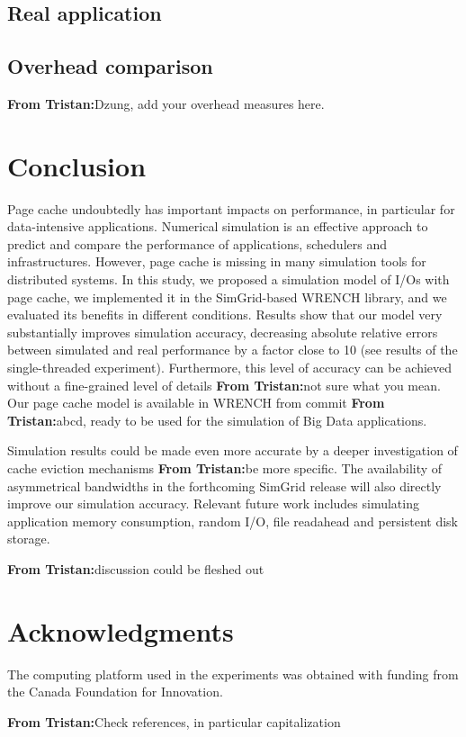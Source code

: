 \documentclass[conference]{IEEEtran}
\newcommand{\tristan}[1]{\color{orange}\textbf{From Tristan:}#1\color{black}}
\begin{document}
        \subsection{Real application}
        \subsection{Overhead comparison}
        \tristan{Dzung, add your overhead measures here.}

    \section{Conclusion}
    \label{discussion}
        Page cache undoubtedly has important impacts on performance, in
        particular for data-intensive applications. Numerical simulation is
        an effective approach to predict and compare the performance of
        applications, schedulers and infrastructures. However, page cache
        is missing in many simulation tools for distributed systems. In
        this study, we proposed a simulation model of I/Os with page cache,
        we implemented it in the SimGrid-based WRENCH library, and we
        evaluated its benefits in different conditions. Results show that
        our model very substantially improves simulation accuracy,
        decreasing absolute relative errors between simulated and real
        performance by a factor close to 10 (see results of the
        single-threaded experiment). Furthermore, this level of accuracy
        can be achieved without a fine-grained level of details
        \tristan{not sure what you mean}. Our page cache model is available
        in WRENCH from commit \tristan{abcd}, ready to be used for the
        simulation of Big Data applications.

        Simulation results could be made even more accurate by a deeper
        investigation of cache eviction mechanisms \tristan{be more
        specific}. The availability of asymmetrical bandwidths in the
        forthcoming SimGrid release will also directly improve our
        simulation accuracy. Relevant future work includes simulating
        application memory consumption, random I/O, file readahead and
        persistent disk storage.

        \tristan{discussion could be fleshed out}

        \section{Acknowledgments}
The computing platform used in the experiments was obtained with funding
from the Canada Foundation for Innovation.

\tristan{Check references, in particular capitalization}

\end{document}
